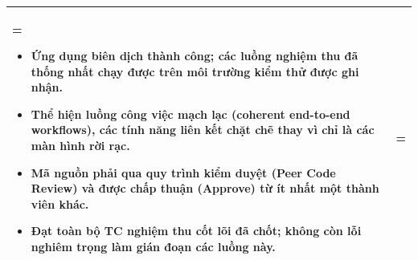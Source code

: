 \documentclass{article}
\begin{document}
\begin{table}[H]
\begin{tabularx}{\textwidth}{|>{\hsize=0.5\hsize\linewidth=\hsize\bfseries}X|>{\hsize=1.5\hsize\linewidth=\hsize}X|}
\begin{itemize}[leftmargin=*, nosep]
            \item Ứng dụng biên dịch thành công; các luồng nghiệm thu đã thống nhất chạy được trên môi trường kiểm thử được ghi nhận.
            \item Thể hiện luồng công việc mạch lạc (coherent end-to-end workflows), các tính năng liên kết chặt chẽ thay vì chỉ là các màn hình rời rạc.
            \item Mã nguồn phải qua quy trình kiểm duyệt (Peer Code Review) và được chấp thuận (Approve) từ ít nhất một thành viên khác.
            \item Đạt toàn bộ TC nghiệm thu cốt lõi đã chốt; không còn lỗi nghiêm trọng làm gián đoạn các luồng này.
        \end{itemize}
        \vspace{-1em} \\
        \hline
    \end{tabularx}
\end{table}
\end{document}
